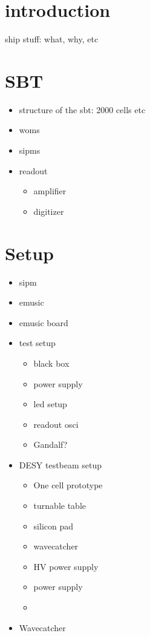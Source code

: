 \chapter{introduction}
ship stuff: what, why, etc



\chapter{SBT}
\begin{itemize}
	\item structure of the sbt: 2000 cells etc
	\item woms 
	\item sipms
	\item readout
	\begin{itemize}
		\item amplifier
		\item digitizer
	\end{itemize}
\end{itemize}

\chapter{Setup}
\begin{itemize}
	\item sipm
	\item emusic
	\item emusic board
	\item test setup
	\begin{itemize}
		\item black box
		\item power supply
		\item led setup
		\item readout osci
		\item Gandalf?
	\end{itemize}
	\item DESY testbeam setup
	\begin{itemize}
		\item One cell prototype
		\item turnable table
		\item silicon pad
		\item wavecatcher
		\item HV power supply
		\item power supply
		\item   
	\end{itemize}
	\item Wavecatcher
\end{itemize}

